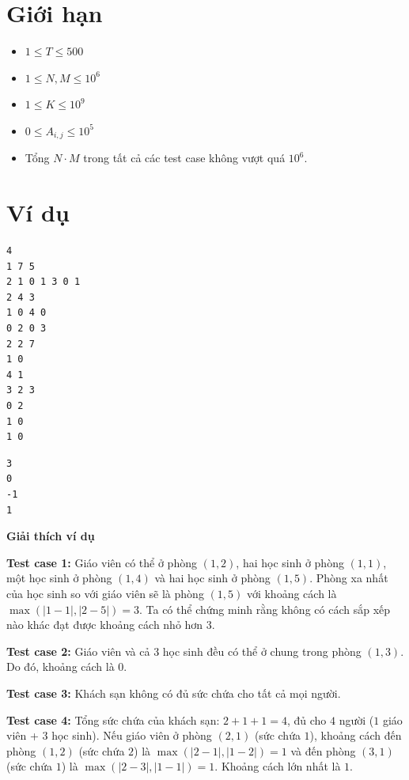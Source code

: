 \documentclass[12pt,a4paper]{article}
\newcommand{\explanation}{%
  \vspace{6pt}\textbf{\textcolor{sectioncolor}{Giải thích ví dụ}}\par\vspace{2pt}%
}
\begin{document}
\section*{Giới hạn}
\begin{constraintbox}
\begin{itemize}
    \item $1 \leq T \leq 500$
    \item $1 \leq N, M \leq 10^6$
    \item $1 \leq K \leq 10^9$
    \item $0 \leq A_{i,j} \leq 10^5$
    \item Tổng $N \cdot M$ trong tất cả các test case không vượt quá $10^6$.
\end{itemize}
\end{constraintbox}

\section*{Ví dụ}
\begin{inputbox}
\begin{lstlisting}
4
1 7 5
2 1 0 1 3 0 1
2 4 3
1 0 4 0
0 2 0 3
2 2 7
1 0
4 1
3 2 3
0 2
1 0
1 0
\end{lstlisting}
\end{inputbox}

\begin{outputbox}
\begin{lstlisting}
3
0
-1
1
\end{lstlisting}
\end{outputbox}

\explanation
\textbf{Test case 1:} Giáo viên có thể ở phòng $(1, 2)$, hai học sinh ở phòng $(1, 1)$, một học sinh ở phòng $(1, 4)$ và hai học sinh ở phòng $(1, 5)$. Phòng xa nhất của học sinh so với giáo viên sẽ là phòng $(1, 5)$ với khoảng cách là $\max(|1-1|, |2-5|) = 3$. Ta có thể chứng minh rằng không có cách sắp xếp nào khác đạt được khoảng cách nhỏ hơn $3$.

\textbf{Test case 2:} Giáo viên và cả $3$ học sinh đều có thể ở chung trong phòng $(1, 3)$. Do đó, khoảng cách là $0$.

\textbf{Test case 3:} Khách sạn không có đủ sức chứa cho tất cả mọi người.

\textbf{Test case 4:} Tổng sức chứa của khách sạn: $2 + 1 + 1 = 4$, đủ cho $4$ người ($1$ giáo viên + $3$ học sinh). Nếu giáo viên ở phòng $(2,1)$ (sức chứa $1$), khoảng cách đến phòng $(1,2)$ (sức chứa $2$) là $\max(|2-1|, |1-2|) = 1$ và đến phòng $(3,1)$ (sức chứa $1$) là $\max(|2-3|, |1-1|) = 1$. Khoảng cách lớn nhất là $1$.
\end{document}
